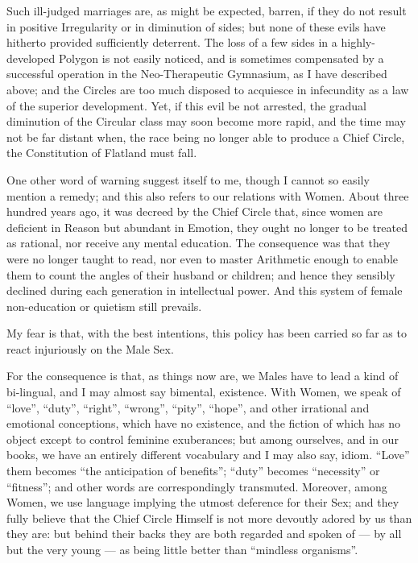 \documentclass[12pt, a4paper, oneside]{memoir}
\begin{document}
Such ill-judged marriages are, as might be expected, barren, if they do not
result in positive Irregularity or in diminution of sides; but none of these
evils have hitherto provided sufficiently deterrent. The loss of a few sides
in a highly-developed Polygon is not easily noticed, and is sometimes
compensated by a successful operation in the Neo-Therapeutic Gymnasium, as I
have described above; and the Circles are too much disposed to acquiesce in
infecundity as a law of the superior development. Yet, if this evil be not
arrested, the gradual diminution of the Circular class may soon become more
rapid, and the time may not be far distant when, the race being no longer able
to produce a Chief Circle, the Constitution of Flatland must fall.

One other word of warning suggest itself to me, though I cannot so easily
mention a remedy; and this also refers to our relations with Women. About
three hundred years ago, it was decreed by the Chief Circle that, since women
are deficient in Reason but abundant in Emotion, they ought no longer to be
treated as rational, nor receive any mental education. The consequence was
that they were no longer taught to read, nor even to master Arithmetic enough
to enable them to count the angles of their husband or children; and hence
they sensibly declined during each generation in intellectual power. And this
system of female non-education or quietism still prevails.

My fear is that, with the best intentions, this policy has been carried so far
as to react injuriously on the Male Sex.

For the consequence is that, as things now are, we Males have to lead a kind
of bi-lingual, and I may almost say bimental, existence. With Women, we speak
of ``love'', ``duty'', ``right'', ``wrong'', ``pity'', ``hope'', and other irrational and
emotional conceptions, which have no existence, and the fiction of which has
no object except to control feminine exuberances; but among ourselves, and in
our books, we have an entirely different vocabulary and I may also say, idiom.
``Love'' them becomes ``the anticipation of benefits''; ``duty'' becomes ``necessity''
or ``fitness''; and other words are correspondingly transmuted. Moreover, among
Women, we use language implying the utmost deference for their Sex; and they
fully believe that the Chief Circle Himself is not more devoutly adored by us
than they are: but behind their backs they are both regarded and spoken of ---
by all but the very young --- as being little better than ``mindless organisms''.
\end{document}
